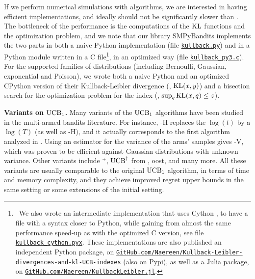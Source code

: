 If we perform numerical simulations with \klUCB{} algorithms, we are interested in having efficient implementations, and ideally \klUCB{} should not be significantly slower than \UCB. The bottleneck of the performance is the computations of the $\mathrm{KL}$ functions and the optimization problem,
and we note that our library SMPyBandits implements the two parts in both a naive Python implementation (file \href{https://github.com/SMPyBandits/SMPyBandits/blob/master/SMPyBandits/Policies/kullback.py}{\texttt{kullback.py}}) and in a Python module written in a
C file\footnote{~We also wrote an intermediate implementation that uses Cython \cite{cython}, to have a file with a syntax closer to Python, while gaining from almost the same performance speed-up as with the optimized C version, see file \href{https://github.com/SMPyBandits/SMPyBandits/blob/master/SMPyBandits/Policies/kullback_cython.pyx}{\texttt{kullback\_cython.pyx}}.
    These implementations are also published an independent Python package, on \href{https://github.com/Naereen/Kullback-Leibler-divergences-and-kl-UCB-indexes}{\texttt{GitHub.com/Naereen/Kullback-Leibler-divergences-and-kl-UCB-indexes}} (also on Pypi),
    as well as a Julia package, on \href{https://github.com/Naereen/KullbackLeibler.jl}{\texttt{GitHub.com/Naereen/KullbackLeibler.jl}}.
},
in an optimized way (file \href{https://github.com/SMPyBandits/SMPyBandits/blob/master/SMPyBandits/Policies/C/kullback_py3.c}{\texttt{kullback\_py3.c}}).
For the supported families of distributions (including Bernoulli, Gaussian, exponential and Poisson), we wrote both a naive Python and an optimized CPython version of their Kullback-Leibler divergence (\ie, $\mathrm{KL}(x,y)$) and a bisection search for the optimization problem for the \klUCB{} index (\ie, $\sup_q \mathrm{KL}(x,q) \leq z$).


\textbf{Variants on $\mathrm{UCB}_1$.}
%
Many variants of the $\mathrm{UCB}_1$ algorithms have been studied in the multi-armed bandits literature.
For instance, \UCB-H replaces the $\log(t)$ by a $\log(T)$ (as well as \klUCB-H), and it actually corresponds to the first algorithm analyzed in \cite{Auer02}.
Using an estimator for the variance of the arms' samples gives \UCB-V, which was proven to be efficient against Gaussian distributions with unknown variance.
Other variants include \UCB$^+$, $\mathrm{UCB}^{\dagger}$ from \cite{Lattimore2018refining}, {\UCB}oost, and many more.
%
All these variants are usually comparable to the original $\mathrm{UCB}_1$ algorithm, in terms of time and memory complexity, and they achieve improved regret upper bounds in the same setting or some extensions of the initial setting.


